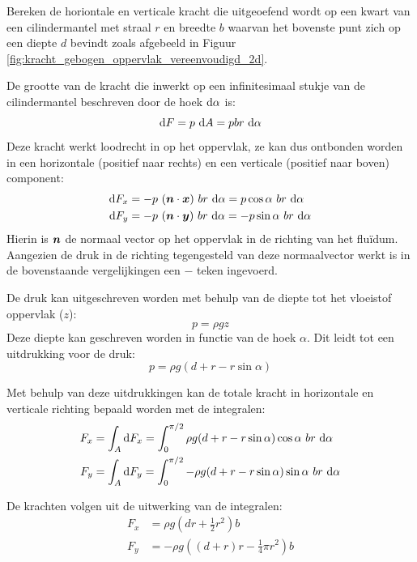 \begin{voorbeeld}
	\label{vb:kracht op cilindermantel}
	Bereken de horiontale en verticale kracht die uitgeoefend wordt op een kwart van een cilindermantel met straal $r$ en breedte $b$ waarvan het bovenste punt zich op een diepte $d$ bevindt zoals afgebeeld in Figuur \ref{fig:kracht_gebogen_oppervlak_vereenvoudigd_2d}.

	De grootte van de kracht die inwerkt op een infinitesimaal stukje van de cilindermantel beschreven door de hoek $\mathrm{d} \alpha$ is:
	\begin{equation*}
		\mathrm{d} F = p\ \mathrm{d} A = p b r\ \mathrm{d} \alpha
	\end{equation*}
	Deze kracht werkt loodrecht in op het oppervlak, ze kan dus ontbonden worden in een horizontale (positief naar rechts) en een verticale (positief naar boven) component:
	\begin{align*}
		\mathrm{d} F_x &= -p \ (\boldsymbol{n} \cdot \boldsymbol{x}) \ b r\ \mathrm{d} \alpha = p \cos \alpha\ b r\ \mathrm{d} \alpha \\
		\mathrm{d} F_y &= -p \ (\boldsymbol{n} \cdot \boldsymbol{y}) \ b r\ \mathrm{d} \alpha = -p \sin \alpha\ b r\ \mathrm{d} \alpha
	\end{align*}
	Hierin is $\boldsymbol{n}$ de normaal vector op het oppervlak in de richting van het fluïdum. Aangezien de druk in de richting tegengesteld van deze normaalvector werkt is in de bovenstaande vergelijkingen een $-$ teken ingevoerd.
	
	De druk kan uitgeschreven worden met behulp van de diepte tot het vloeistof oppervlak ($z$):
	\begin{equation*}
		p = \rho g z
	\end{equation*}
	Deze diepte kan geschreven worden in functie van de hoek $\alpha$. Dit leidt tot een uitdrukking voor de druk:
	\begin{equation*}
		p = \rho g (d + r - r \sin \alpha)
	\end{equation*}
	
	Met behulp van deze uitdrukkingen kan de totale kracht in horizontale en verticale richting bepaald worden met de integralen:
	\begin{align*}
		F_x &= \int_A \mathrm{d} F_x = \int_0^{\pi/2} \rho g (d + r - r \sin \alpha) \cos \alpha\ b r\ \mathrm{d} \alpha \\
		F_y &= \int_A \mathrm{d} F_y = \int_0^{\pi/2} -\rho g (d + r - r \sin \alpha) \sin \alpha\ b r\ \mathrm{d} \alpha
	\end{align*}

	De krachten volgen uit de uitwerking van de integralen:
	\begin{align*}
		F_x &= \rho g \left(d r + \frac{1}{2} r^2 \right) b \\
		F_y &= -\rho g \left( (d+r) r - \frac{1}{4} \pi r^2 \right) b
	\end{align*}
\end{voorbeeld}


